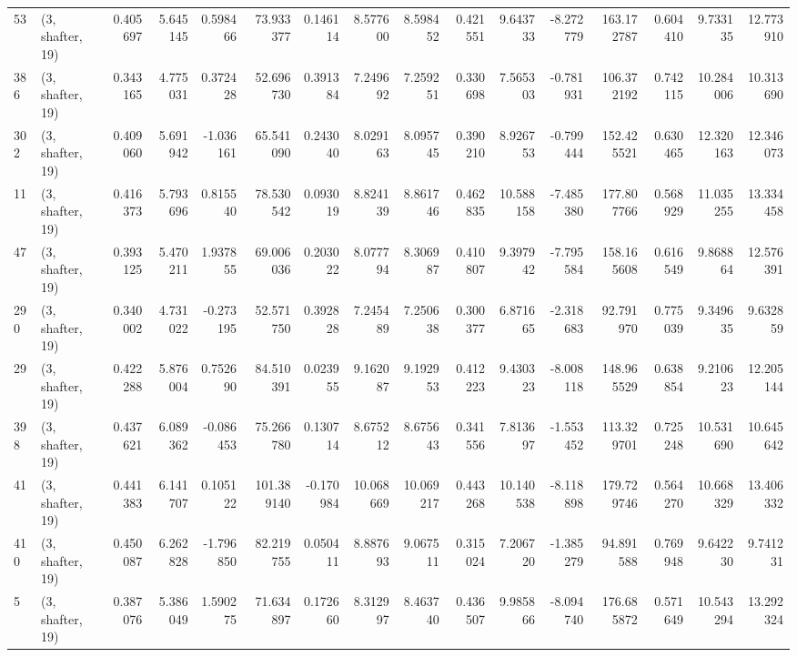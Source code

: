 \begin{tabular}{llrrrrrrrrrrrrrr}
53  &  (3, shafter, 19) &   0.405697 &   5.645145 &   0.598466 &    73.933377 &   0.146114 &   8.577600 &   8.598452 &  0.421551 &   9.643733 &  -8.272779 &   163.172787 &  0.604410 &   9.733135 &  12.773910 \\
386 &  (3, shafter, 19) &   0.343165 &   4.775031 &   0.372428 &    52.696730 &   0.391384 &   7.249692 &   7.259251 &  0.330698 &   7.565303 &  -0.781931 &   106.372192 &  0.742115 &  10.284006 &  10.313690 \\
302 &  (3, shafter, 19) &   0.409060 &   5.691942 &  -1.036161 &    65.541090 &   0.243040 &   8.029163 &   8.095745 &  0.390210 &   8.926753 &  -0.799444 &   152.425521 &  0.630465 &  12.320163 &  12.346073 \\
11  &  (3, shafter, 19) &   0.416373 &   5.793696 &   0.815540 &    78.530542 &   0.093019 &   8.824139 &   8.861746 &  0.462835 &  10.588158 &  -7.485380 &   177.807766 &  0.568929 &  11.035255 &  13.334458 \\
47  &  (3, shafter, 19) &   0.393125 &   5.470211 &   1.937855 &    69.006036 &   0.203022 &   8.077794 &   8.306987 &  0.410807 &   9.397942 &  -7.795584 &   158.165608 &  0.616549 &   9.868864 &  12.576391 \\
290 &  (3, shafter, 19) &   0.340002 &   4.731022 &  -0.273195 &    52.571750 &   0.392828 &   7.245489 &   7.250638 &  0.300377 &   6.871665 &  -2.318683 &    92.791970 &  0.775039 &   9.349635 &   9.632859 \\
29  &  (3, shafter, 19) &   0.422288 &   5.876004 &   0.752690 &    84.510391 &   0.023955 &   9.162087 &   9.192953 &  0.412223 &   9.430323 &  -8.008118 &   148.965529 &  0.638854 &   9.210623 &  12.205144 \\
398 &  (3, shafter, 19) &   0.437621 &   6.089362 &  -0.086453 &    75.266780 &   0.130714 &   8.675212 &   8.675643 &  0.341556 &   7.813697 &  -1.553452 &   113.329701 &  0.725248 &  10.531690 &  10.645642 \\
41  &  (3, shafter, 19) &   0.441383 &   6.141707 &   0.105122 &   101.389140 &  -0.170984 &  10.068669 &  10.069217 &  0.443268 &  10.140538 &  -8.118898 &   179.729746 &  0.564270 &  10.668329 &  13.406332 \\
410 &  (3, shafter, 19) &   0.450087 &   6.262828 &  -1.796850 &    82.219755 &   0.050411 &   8.887693 &   9.067511 &  0.315024 &   7.206720 &  -1.385279 &    94.891588 &  0.769948 &   9.642230 &   9.741231 \\
5   &  (3, shafter, 19) &   0.387076 &   5.386049 &   1.590275 &    71.634897 &   0.172660 &   8.312997 &   8.463740 &  0.436507 &   9.985866 &  -8.094740 &   176.685872 &  0.571649 &  10.543294 &  13.292324 \\

\end{tabular}
